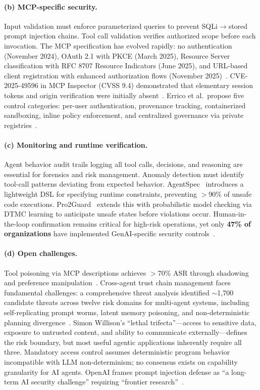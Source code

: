 \paragraph{(b) MCP-specific security.}
Input validation must enforce parameterized queries to prevent SQLi$\to$stored prompt injection chains. Tool call validation verifies authorized scope before each invocation. The MCP specification has evolved rapidly: no authentication (November 2024), OAuth 2.1 with PKCE (March 2025), Resource Server classification with RFC 8707 Resource Indicators (June 2025), and URL-based client registration with enhanced authorization flows (November 2025)~\cite{mcpspec2025}. CVE-2025-49596 in MCP Inspector (CVSS 9.4) demonstrated that elementary session tokens and origin verification were initially absent~\cite{oligo2025inspector}. Errico et al.\ propose five control categories: per-user authentication, provenance tracking, containerized sandboxing, inline policy enforcement, and centralized governance via private registries~\cite{errico2025mcpsecurity}.

\paragraph{(c) Monitoring and runtime verification.}
Agent behavior audit trails logging all tool calls, decisions, and reasoning are essential for forensics and risk management. Anomaly detection must identify tool-call patterns deviating from expected behavior. AgentSpec~\cite{wang2025agentspec} introduces a lightweight DSL for specifying runtime constraints, preventing $>$90\% of unsafe code executions. Pro2Guard~\cite{pro2guard2025} extends this with probabilistic model checking via DTMC learning to anticipate unsafe states before violations occur. Human-in-the-loop confirmation remains critical for high-risk operations, yet only \textbf{47\% of organizations} have implemented GenAI-specific security controls~\cite{microsoft2026cyberpulse}.

\paragraph{(d) Open challenges.}
Tool poisoning via MCP descriptions achieves $>$70\% ASR through shadowing and preference manipulation~\cite{invariant2025toolpoisoning}. Cross-agent trust chain management faces fundamental challenges: a comprehensive threat analysis identified $\sim$1,700 candidate threats across twelve risk domains for multi-agent systems, including self-replicating prompt worms, latent memory poisoning, and non-deterministic planning divergence~\cite{multiagent2026threats}. Simon Willison's ``lethal trifecta''---access to sensitive data, exposure to untrusted content, and ability to communicate externally---defines the risk boundary, but most useful agentic applications inherently require all three. Mandatory access control assumes deterministic program behavior incompatible with LLM non-determinism; no consensus exists on capability granularity for AI agents. OpenAI frames prompt injection defense as ``a long-term AI security challenge'' requiring ``frontier research''~\cite{openai2025atlas}.

